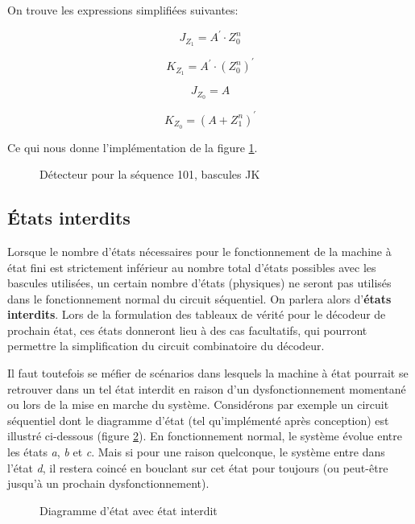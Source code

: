 \documentclass[11pt]{article}
\begin{document}
On trouve les expressions simplifiées suivantes:

$$ J_{Z_1} = A^\prime \cdot Z_0^n $$

$$ K_{Z_1} = A^\prime \cdot (Z_0^n)^\prime $$

$$ J_{Z_0} = A $$ 

$$ K_{Z_0} = (A + Z_1^n)^\prime $$

Ce qui nous donne l'implémentation de la figure \ref{fig:orgcbda093}.

\begin{figure}[htbp]
\centering

\caption{\label{fig:orgcbda093}Détecteur pour la séquence 101, bascules JK}
\end{figure}

\subsection{États interdits}
\label{sec:org96d6737}

Lorsque le nombre d'états nécessaires pour le fonctionnement de la
machine à état fini est strictement inférieur au nombre total d'états
possibles avec les bascules utilisées, un certain nombre d'états
(physiques) ne seront pas utilisés dans le fonctionnement normal du
circuit séquentiel. On parlera alors d'\textbf{états interdits}.  Lors de la
formulation des tableaux de vérité pour le décodeur de prochain état,
ces états donneront lieu à des cas facultatifs, qui pourront permettre
la simplification du circuit combinatoire du décodeur.

Il faut toutefois se méfier de scénarios dans lesquels la machine à
état pourrait se retrouver dans un tel état interdit en raison d'un
dysfonctionnement momentané ou lors de la mise en marche du
système. Considérons par exemple un circuit séquentiel dont le
diagramme d'état (tel qu'implémenté après conception) est illustré
ci-dessous (figure \ref{fig:orgf814994}). En fonctionnement normal, le
système évolue entre les états \emph{a}, \emph{b} et \emph{c}. Mais si pour une
raison quelconque, le système entre dans l'état \emph{d}, il restera coincé
en bouclant sur cet état pour toujours (ou peut-être jusqu'à un
prochain dysfonctionnement).

\begin{figure}[htbp]
\centering

\caption{\label{fig:orgf814994}Diagramme d'état avec état interdit}
\end{figure}
\end{document}
